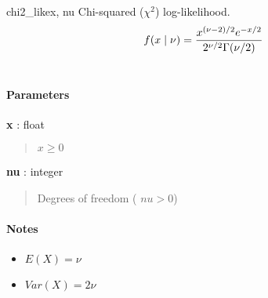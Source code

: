 \hypertarget{pymc.distributions.chi2_like}{}
\begin{funcdesc}{chi2\_like}{x, nu}
Chi-squared ($\chi^2$) log-likelihood.
\begin{gather}
\begin{split}f(x \mid \nu) = \frac{x^{(\nu-2)/2}e^{-x/2}}{2^{\nu/2}\Gamma(\nu/2)}\end{split}\notag\\\begin{split}\end{split}\notag
\end{gather}
\paragraph{Parameters}
\begin{paramlist}
\item[] \textbf{x} : float
\begin{quote}

$x \ge 0$
\end{quote}

\item[] \textbf{nu} : integer
\begin{quote}

Degrees of freedom ( $nu > 0$)
\end{quote}
\end{paramlist}
\paragraph{Notes}
\begin{itemize}
\item {}
$E(X)=\nu$

\item {}
$Var(X)=2\nu$

\end{itemize}
\end{funcdesc}

